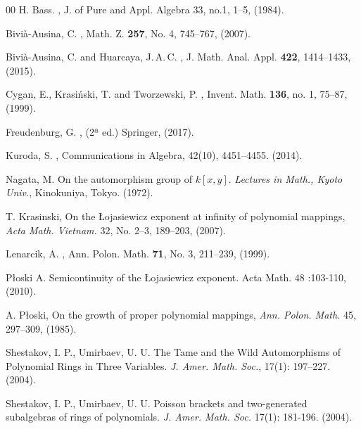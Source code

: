 \documentclass{amsart}
\begin{document}
\begin{thebibliography}{00}
		 	H. Bass.
	,
	\newblock J. of Pure and Appl. Algebra 33, no.1, 1–5, (1984). 
	

	
	 Bivià-Ausina, C.
	,
	\newblock Math. Z. {\bf 257}, No. 4, 745--767, (2007).
	
	 Bivià-Ausina, C. and Huarcaya, J.\,A.\,C.
	,
	\newblock J. Math. Anal. Appl. {\bf 422}, 1414--1433,  (2015).
	
	 Cygan, E., Krasi\'nski, T. and Tworzewski, P.
	,
	\newblock Invent. Math. {\bf 136}, no. 1, 75--87,  (1999). 
	
			 	Freudenburg, G. 
	,
	\newblock  (2ª ed.) Springer, 
	(2017).
	

 	Kuroda, S.
,
\newblock Communications in Algebra, 42(10), 4451–4455. %
 (2014).  

	 Nagata, M.
On the automorphism group of $k[x, y]$. 	\textit{ Lectures in Math., Kyoto Univ.}, Kinokuniya, Tokyo.  (1972). 

	T. Krasinski, On the Łojasiewicz exponent at infinity of polynomial mappings, 	\textit{ Acta
Math. Vietnam.} 32, No. 2–3, 189–203,  (2007).

 Lenarcik, A.
,
\newblock Ann. Polon. Math. {\bf 71}, No. 3, 211–239,  (1999).

Płoski A. Semicontinuity of the Łojasiewicz exponent. Acta Math.  48 :103-110, (2010). 

A. P\l{}oski, On the growth of proper polynomial mappings, \textit{Ann. Polon. Math.} 45,
297–309,  (1985).
	
	 Shestakov, I. P.,  Umirbaev, U. U. 
The Tame and the Wild Automorphisms of Polynomial Rings in Three Variables.	\textit{J. Amer. Math. Soc.}, 17(1): 197–227. (2004). 
	
	 Shestakov, I. P.,  Umirbaev, U. U.  Poisson brackets and two-generated subalgebras of rings of polynomials. \textit{J. Amer. Math. Soc.} 17(1): 181-196.  (2004). 
\end{thebibliography}
\end{document}
